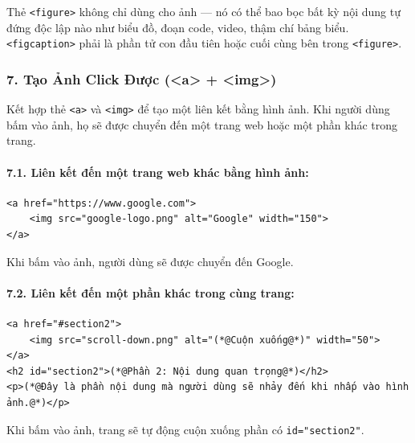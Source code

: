 \documentclass[11pt,oneside]{book}
\newcommand{\codeinline}[1]{\textcolor{accentOrange}{\texttt{#1}}}
\begin{document}
\begin{noteBox}
Thẻ \codeinline{<figure>} không chỉ dùng cho ảnh — nó có thể bao bọc bất kỳ nội dung tự đứng độc lập nào như biểu đồ, đoạn code, video, thậm chí bảng biểu. \codeinline{<figcaption>} phải là phần tử con đầu tiên hoặc cuối cùng bên trong \codeinline{<figure>}.
\end{noteBox}

\subsubsection{7. Tạo Ảnh Click Được (<a> + <img>)}

Kết hợp thẻ \codeinline{<a>} và \codeinline{<img>} để tạo một liên kết bằng hình ảnh. Khi người dùng bấm vào ảnh, họ sẽ được chuyển đến một trang web hoặc một phần khác trong trang.

\paragraph{7.1. Liên kết đến một trang web khác bằng hình ảnh:}
\begin{codeWindow}
\begin{lstlisting}[language=HTML5]
<a href="https://www.google.com">
    <img src="google-logo.png" alt="Google" width="150">
</a>
\end{lstlisting}
\end{codeWindow}

Khi bấm vào ảnh, người dùng sẽ được chuyển đến Google.

\paragraph{7.2. Liên kết đến một phần khác trong cùng trang:}
\begin{codeWindow}
\begin{lstlisting}[language=HTML5]
<a href="#section2">
    <img src="scroll-down.png" alt="(*@Cuộn xuống@*)" width="50">
</a>
<h2 id="section2">(*@Phần 2: Nội dung quan trọng@*)</h2>
<p>(*@Đây là phần nội dung mà người dùng sẽ nhảy đến khi nhấp vào hình ảnh.@*)</p>
\end{lstlisting}
\end{codeWindow}

Khi bấm vào ảnh, trang sẽ tự động cuộn xuống phần có \codeinline{id="section2"}.
\end{document}
